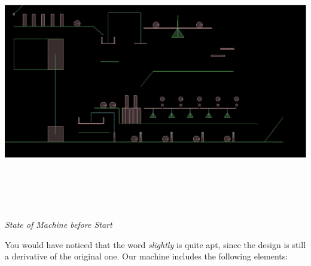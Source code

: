 \documentclass[a4paper,11pt]{article}
\begin{document}
\begin{center}
\includegraphics[width=160mm, height=120mm]{state_00.eps}\\
\emph{State of Machine before Start}
\end{center}

You would have noticed that the word \emph{slightly} is quite apt, since the design is still a derivative of the original one. Our machine includes the following elements:
\end{document}
